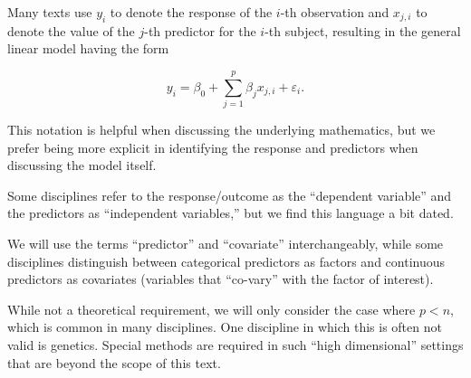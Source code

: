 \documentclass[
  letterpaper,
  DIV=11,
  numbers=noendperiod]{scrreprt}
\theoremstyle{definition}
\theoremstyle{definition}
\theoremstyle{remark}
\begin{document}
\begin{tcolorbox}[enhanced jigsaw, left=2mm, toprule=.15mm, arc=.35mm, breakable, opacitybacktitle=0.6, opacityback=0, rightrule=.15mm, colbacktitle=quarto-callout-note-color!10!white, coltitle=black, leftrule=.75mm, toptitle=1mm, colframe=quarto-callout-note-color-frame, titlerule=0mm, title=\textcolor{quarto-callout-note-color}{\faInfo}\hspace{0.5em}{Note}, bottomrule=.15mm, colback=white, bottomtitle=1mm]

Many texts use \(y_i\) to denote the response of the \(i\)-th
observation and \(x_{j,i}\) to denote the value of the \(j\)-th
predictor for the \(i\)-th subject, resulting in the general linear
model having the form

\[y_i = \beta_0 + \sum\limits_{j=1}^{p} \beta_j x_{j, i} + \varepsilon_i.\]

This notation is helpful when discussing the underlying mathematics, but
we prefer being more explicit in identifying the response and predictors
when discussing the model itself.

\end{tcolorbox}

\begin{tcolorbox}[enhanced jigsaw, left=2mm, toprule=.15mm, arc=.35mm, breakable, opacitybacktitle=0.6, opacityback=0, rightrule=.15mm, colbacktitle=quarto-callout-note-color!10!white, coltitle=black, leftrule=.75mm, toptitle=1mm, colframe=quarto-callout-note-color-frame, titlerule=0mm, title=\textcolor{quarto-callout-note-color}{\faInfo}\hspace{0.5em}{Note}, bottomrule=.15mm, colback=white, bottomtitle=1mm]

Some disciplines refer to the response/outcome as the ``dependent
variable'' and the predictors as ``independent variables,'' but we find
this language a bit dated.

We will use the terms ``predictor'' and ``covariate'' interchangeably,
while some disciplines distinguish between categorical predictors as
factors and continuous predictors as covariates (variables that
``co-vary'' with the factor of interest).

\end{tcolorbox}

\begin{tcolorbox}[enhanced jigsaw, left=2mm, toprule=.15mm, arc=.35mm, breakable, opacitybacktitle=0.6, opacityback=0, rightrule=.15mm, colbacktitle=quarto-callout-note-color!10!white, coltitle=black, leftrule=.75mm, toptitle=1mm, colframe=quarto-callout-note-color-frame, titlerule=0mm, title=\textcolor{quarto-callout-note-color}{\faInfo}\hspace{0.5em}{Note}, bottomrule=.15mm, colback=white, bottomtitle=1mm]

While not a theoretical requirement, we will only consider the case
where \(p < n\), which is common in many disciplines. One discipline in
which this is often not valid is genetics. Special methods are required
in such ``high dimensional'' settings that are beyond the scope of this
text.

\end{tcolorbox}
\end{document}
